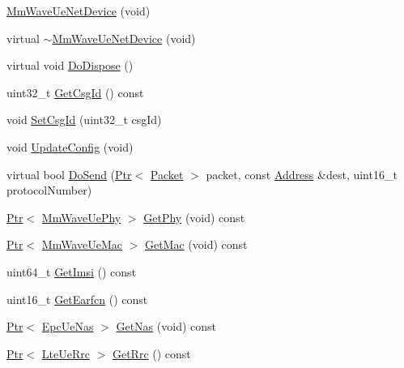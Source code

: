 \begin{DoxyCompactItemize}
\item 
\hyperlink{classns3_1_1MmWaveUeNetDevice_a7bed74bacd0d2ac190e73f2d0def4ea1}{Mm\+Wave\+Ue\+Net\+Device} (void)
\item 
virtual \hyperlink{classns3_1_1MmWaveUeNetDevice_a73b1f38d3eefa72b7cad99fc7b979d25}{$\sim$\+Mm\+Wave\+Ue\+Net\+Device} (void)
\item 
virtual void \hyperlink{classns3_1_1MmWaveUeNetDevice_a683a87b9d771514f9917dd11abde2f46}{Do\+Dispose} ()
\item 
uint32\+\_\+t \hyperlink{classns3_1_1MmWaveUeNetDevice_af9571f98461549daa84517ed04f9b500}{Get\+Csg\+Id} () const 
\item 
void \hyperlink{classns3_1_1MmWaveUeNetDevice_a9d957ce404e4e7bd589e3c7727c67a12}{Set\+Csg\+Id} (uint32\+\_\+t csg\+Id)
\item 
void \hyperlink{classns3_1_1MmWaveUeNetDevice_a3901965417e1710881a1fa6208cfa6d4}{Update\+Config} (void)
\item 
virtual bool \hyperlink{classns3_1_1MmWaveUeNetDevice_a5e093b3eb0d751638947845a4da133c9}{Do\+Send} (\hyperlink{classns3_1_1Ptr}{Ptr}$<$ \hyperlink{classns3_1_1Packet}{Packet} $>$ packet, const \hyperlink{classns3_1_1Address}{Address} \&dest, uint16\+\_\+t protocol\+Number)
\item 
\hyperlink{classns3_1_1Ptr}{Ptr}$<$ \hyperlink{classns3_1_1MmWaveUePhy}{Mm\+Wave\+Ue\+Phy} $>$ \hyperlink{classns3_1_1MmWaveUeNetDevice_a4e73c5e9e36295b877907249576a8d38}{Get\+Phy} (void) const 
\item 
\hyperlink{classns3_1_1Ptr}{Ptr}$<$ \hyperlink{classns3_1_1MmWaveUeMac}{Mm\+Wave\+Ue\+Mac} $>$ \hyperlink{classns3_1_1MmWaveUeNetDevice_aa9504b50cdbea65dd455a6a7cf5d101c}{Get\+Mac} (void) const 
\item 
uint64\+\_\+t \hyperlink{classns3_1_1MmWaveUeNetDevice_a875c917d3ea3e2c7cb2918de91f020f4}{Get\+Imsi} () const 
\item 
uint16\+\_\+t \hyperlink{classns3_1_1MmWaveUeNetDevice_ad5dfee4bfbd02ea8ce911a2f14e3f392}{Get\+Earfcn} () const 
\item 
\hyperlink{classns3_1_1Ptr}{Ptr}$<$ \hyperlink{classns3_1_1EpcUeNas}{Epc\+Ue\+Nas} $>$ \hyperlink{classns3_1_1MmWaveUeNetDevice_a4253473d13b83c8b2e1f342b75a81eb0}{Get\+Nas} (void) const 
\item 
\hyperlink{classns3_1_1Ptr}{Ptr}$<$ \hyperlink{classns3_1_1LteUeRrc}{Lte\+Ue\+Rrc} $>$ \hyperlink{classns3_1_1MmWaveUeNetDevice_a696494c7ffd3d165591ba8a1c99b9558}{Get\+Rrc} () const 

\end{DoxyCompactItemize}

